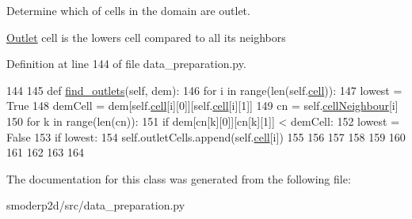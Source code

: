Determine which of cells in the domain are outlet. 

\hyperlink{classsmoderp2d_1_1src_1_1data__preparation_1_1Outlet}{Outlet} cell is the lowers cell compared to all its neighbors 

Definition at line 144 of file data\-\_\-preparation.\-py.


\begin{DoxyCode}
144 
145   \textcolor{keyword}{def }\hyperlink{classsmoderp2d_1_1src_1_1data__preparation_1_1Outlet_a2243e5b391c4db099fc2876f09b7ef28}{find\_outlets}(self, dem):
146     \textcolor{keywordflow}{for} i \textcolor{keywordflow}{in} range(len(self.\hyperlink{classsmoderp2d_1_1src_1_1data__preparation_1_1Outlet_ac0532eb0756f3428f6180c86101eec10}{cell})):
147       lowest = \textcolor{keyword}{True}
148       demCell = dem[self.\hyperlink{classsmoderp2d_1_1src_1_1data__preparation_1_1Outlet_ac0532eb0756f3428f6180c86101eec10}{cell}[i][0]][self.\hyperlink{classsmoderp2d_1_1src_1_1data__preparation_1_1Outlet_ac0532eb0756f3428f6180c86101eec10}{cell}[i][1]]
149       cn = self.\hyperlink{classsmoderp2d_1_1src_1_1data__preparation_1_1Outlet_a386a5fd492d80579f104fa0c35748316}{cellNeighbour}[i]
150       \textcolor{keywordflow}{for} k \textcolor{keywordflow}{in} range(len(cn)):
151         \textcolor{keywordflow}{if} dem[cn[k][0]][cn[k][1]] < demCell:
152           lowest = \textcolor{keyword}{False}
153       \textcolor{keywordflow}{if} lowest:
154         self.outletCells.append(self.\hyperlink{classsmoderp2d_1_1src_1_1data__preparation_1_1Outlet_ac0532eb0756f3428f6180c86101eec10}{cell}[i])
155 
156 
157 
158 
159 
160 
161 
162 
163 
164 

\end{DoxyCode}


The documentation for this class was generated from the following file\-:\begin{DoxyCompactItemize}
\item 
smoderp2d/src/data\-\_\-preparation.\-py\end{DoxyCompactItemize}
